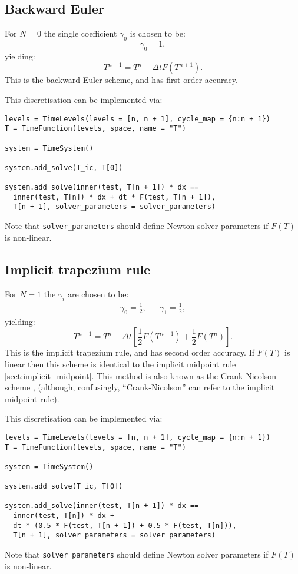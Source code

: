\documentclass[a4paper]{book}
\begin{document}
\subsection{Backward Euler}\label{sect:be}

For $N = 0$ the single coefficient $\gamma_0$ is chosen to be:
\begin{equation}
  \gamma_0 = 1,
\end{equation}
yielding:
\begin{equation}
  T^{n + 1} = T^n + \Delta t F(T^{n + 1}).
\end{equation}
This is the backward Euler scheme, and has first order accuracy.

This discretisation can be implemented via:
\begin{lstlisting}
levels = TimeLevels(levels = [n, n + 1], cycle_map = {n:n + 1})
T = TimeFunction(levels, space, name = "T")

system = TimeSystem()

system.add_solve(T_ic, T[0])

system.add_solve(inner(test, T[n + 1]) * dx ==
  inner(test, T[n]) * dx + dt * F(test, T[n + 1]),
  T[n + 1], solver_parameters = solver_parameters)
\end{lstlisting}
Note that \verb+solver_parameters+ should define Newton solver parameters if
$F(T)$ is non-linear.

\subsection{Implicit trapezium rule}\label{sect:implicit_trapezium}

For $N = 1$ the $\gamma_i$ are chosen to be:
\begin{align}
  \gamma_0 = \frac{1}{2}, & & \gamma_1 = \frac{1}{2},
\end{align}
yielding:
\begin{equation}
  T^{n + 1} = T^n + \Delta t \left[ \frac{1}{2} F(T^{n + 1}) + \frac{1}{2} F(T^n) \right].
\end{equation}
This is the implicit trapezium rule, and has second order accuracy. If $F(T)$ is
linear then this scheme is identical to the implicit midpoint rule
\ref{sect:implicit_midpoint}. This method is also known as the Crank-Nicolson
scheme \citep[e.g.][section 3.4]{donea2003}, (although, confusingly,
``Crank-Nicolson'' can refer to the implicit midpoint rule).

This discretisation can be implemented via:
\begin{lstlisting}
levels = TimeLevels(levels = [n, n + 1], cycle_map = {n:n + 1})
T = TimeFunction(levels, space, name = "T")

system = TimeSystem()

system.add_solve(T_ic, T[0])

system.add_solve(inner(test, T[n + 1]) * dx ==
  inner(test, T[n]) * dx +
  dt * (0.5 * F(test, T[n + 1]) + 0.5 * F(test, T[n])),
  T[n + 1], solver_parameters = solver_parameters)
\end{lstlisting}
Note that \verb+solver_parameters+ should define Newton solver parameters if
$F(T)$ is non-linear.
\end{document}
